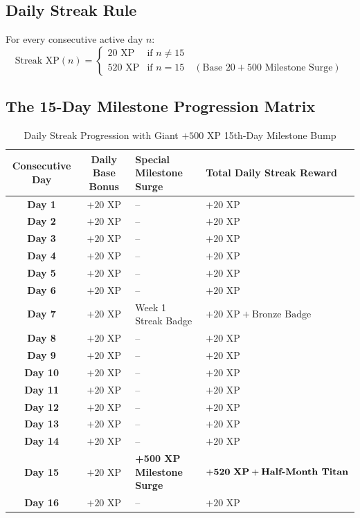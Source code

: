 \subsection{Daily Streak Rule}
For every consecutive active day $n$:
\begin{equation}
\text{Streak XP}(n) = 
\begin{cases} 
20\text{ XP} & \text{if } n \neq 15 \\
520\text{ XP} & \text{if } n = 15 \quad (\text{Base } 20 + 500\text{ Milestone Surge})
\end{cases}
\end{equation}

\subsection{The 15-Day Milestone Progression Matrix}
\begin{table}[htbp]
\centering
\footnotesize
\begin{tabular}{|c|c|p{4.5cm}|p{4.5cm}|}
\hline
\rowcolor{primaryBlue!15}
\textbf{Consecutive Day} & \textbf{Daily Base Bonus} & \textbf{Special Milestone Surge} & \textbf{Total Daily Streak Reward} \\ \hline
\textbf{Day 1} & $+20\text{ XP}$ & -- & $+20\text{ XP}$ \\ \hline
\textbf{Day 2} & $+20\text{ XP}$ & -- & $+20\text{ XP}$ \\ \hline
\textbf{Day 3} & $+20\text{ XP}$ & -- & $+20\text{ XP}$ \\ \hline
\textbf{Day 4} & $+20\text{ XP}$ & -- & $+20\text{ XP}$ \\ \hline
\textbf{Day 5} & $+20\text{ XP}$ & -- & $+20\text{ XP}$ \\ \hline
\textbf{Day 6} & $+20\text{ XP}$ & -- & $+20\text{ XP}$ \\ \hline
\textbf{Day 7} & $+20\text{ XP}$ & Week 1 Streak Badge & $+20\text{ XP} + \text{Bronze Badge}$ \\ \hline
\textbf{Day 8} & $+20\text{ XP}$ & -- & $+20\text{ XP}$ \\ \hline
\textbf{Day 9} & $+20\text{ XP}$ & -- & $+20\text{ XP}$ \\ \hline
\textbf{Day 10} & $+20\text{ XP}$ & -- & $+20\text{ XP}$ \\ \hline
\textbf{Day 11} & $+20\text{ XP}$ & -- & $+20\text{ XP}$ \\ \hline
\textbf{Day 12} & $+20\text{ XP}$ & -- & $+20\text{ XP}$ \\ \hline
\textbf{Day 13} & $+20\text{ XP}$ & -- & $+20\text{ XP}$ \\ \hline
\textbf{Day 14} & $+20\text{ XP}$ & -- & $+20\text{ XP}$ \\ \hline
\rowcolor{accentAmber!20}
\textbf{Day 15} & $+20\text{ XP}$ & \textbf{+500 XP Milestone Surge} & $\mathbf{+520\text{ \textbf{XP}}} + \text{\textbf{Half-Month Titan}}$ \\ \hline
\textbf{Day 16} & $+20\text{ XP}$ & -- & $+20\text{ XP}$ \\ \hline
\end{tabular}
\caption{Daily Streak Progression with Giant $+500\text{ XP}$ 15th-Day Milestone Bump}
\end{table}

